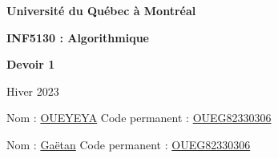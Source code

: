 \documentclass[11pt]{article}
\begin{document}
\thispagestyle{empty}

\begin{center}
\textbf{\Large Université du Qu\'ebec \`a Montr\'eal}

\bigskip
\bigskip

\textbf{\LARGE INF5130 : Algorithmique}

\bigskip
\bigskip
\bigskip

\textbf{\LARGE Devoir 1}

\vspace{0.5em}

\bigskip
\bigskip

\large

Hiver 2023

\bigskip

\normalsize

\bigskip
\bigskip

\end{center}





\rm

\bigskip
\bigskip

Nom : \underline{OUEYEYA} \hfill{}  Code permanent : \underline{OUEG82330306} 

\bigskip
\bigskip

Nom : \underline{Gaëtan} \hfill{}Code permanent : \underline{OUEG82330306} 


\newpage
\end{document}
